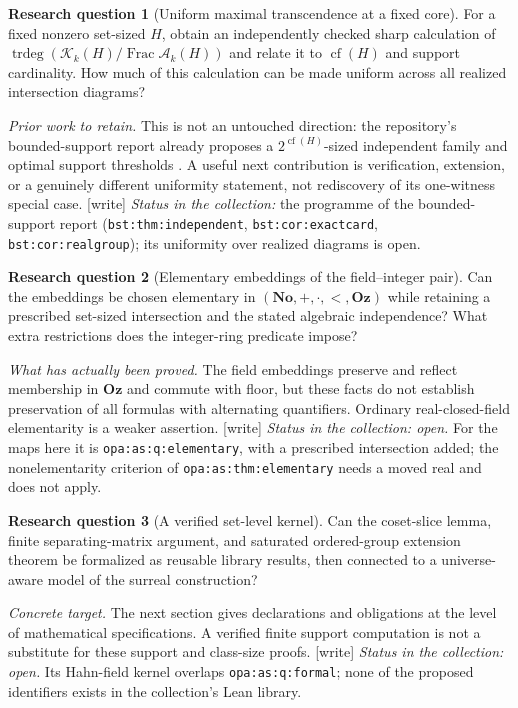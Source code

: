 \documentclass[11pt,letterpaper]{article}
\theoremstyle{definition}
\newtheorem{question}{Research question}
\theoremstyle{remark}
\newcommand{\No}{\mathbf{No}}
\newcommand{\Oz}{\mathbf{Oz}}
\newcommand{\K}[2]{\mathcal K_{#1}(#2)}
\newcommand{\A}[2]{\mathcal A_{#1}(#2)}
\newcommand{\Frac}{\operatorname{Frac}}
\newcommand{\trdeg}{\operatorname{trdeg}}
\newcommand{\cf}{\operatorname{cf}}
\newcommand{\lbl}[1]{\nolinkurl{#1}}%
\newcommand{\wtag}{\textup{[write]}}%
\numberwithin{equation}{section}
\begin{document}
\begin{question}[Uniform maximal transcendence at a fixed core]
For a fixed nonzero set-sized $H$, obtain an independently checked sharp
calculation of
$\trdeg(\K{k}{H}/\Frac\A{k}{H})$ and relate it to $\cf(H)$ and support
cardinality. How much of this calculation can be made uniform across all
realized intersection diagrams?
\end{question}
\noindent\emph{Prior work to retain.} This is not an untouched direction:
the repository's bounded-support report already proposes a
$2^{\cf(H)}$-sized independent family and optimal support thresholds
\cite{RepoBounded}. A useful next contribution is verification, extension,
or a genuinely different uniformity statement, not rediscovery of its
one-witness special case.
\wtag{} \emph{Status in the collection:} the programme of the
bounded-support report (\lbl{bst:thm:independent}, \lbl{bst:cor:exactcard},
\lbl{bst:cor:realgroup}); its uniformity over realized diagrams is open.

\begin{question}[Elementary embeddings of the field--integer pair]
Can the embeddings be chosen elementary in
$(\No,+,\cdot,<,\Oz)$ while retaining a prescribed set-sized intersection
and the stated algebraic independence? What extra restrictions does the
integer-ring predicate impose?
\end{question}
\noindent\emph{What has actually been proved.} The field embeddings preserve
and reflect membership in $\Oz$ and commute with floor, but these facts do
not establish preservation of all formulas with alternating quantifiers.
Ordinary real-closed-field elementarity is a weaker assertion.
\wtag{} \emph{Status in the collection: open.} For the maps here it is
\lbl{opa:as:q:elementary}, with a prescribed intersection added; the
nonelementarity criterion of \lbl{opa:as:thm:elementary} needs a moved real
and does not apply.

\begin{question}[A verified set-level kernel]
Can the coset-slice lemma, finite separating-matrix argument, and saturated
ordered-group extension theorem be formalized as reusable library results,
then connected to a universe-aware model of the surreal construction?
\end{question}
\noindent\emph{Concrete target.} The next section gives declarations and
obligations at the level of mathematical specifications. A verified finite
support computation is not a substitute for these support and class-size
proofs.
\wtag{} \emph{Status in the collection: open.} Its Hahn-field kernel
overlaps \lbl{opa:as:q:formal}; none of the proposed identifiers exists in
the collection's Lean library.
\end{document}

